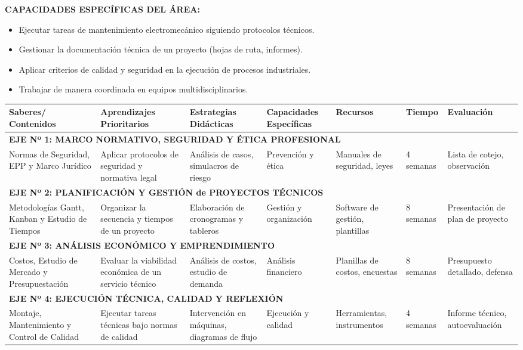 \documentclass[11pt, a4paper]{article}
\begin{document}
\vspace{1em}
\noindent \textbf{CAPACIDADES ESPECÍFICAS DEL ÁREA:}
\begin{itemize}
\item Ejecutar tareas de mantenimiento electromecánico siguiendo protocolos técnicos.
\item Gestionar la documentación técnica de un proyecto (hojas de ruta, informes).
\item Aplicar criterios de calidad y seguridad en la ejecución de procesos industriales.
\item Trabajar de manera coordinada en equipos multidisciplinarios.
\end{itemize}

\vspace{1em}
\begin{longtable}{|p{2.5cm}|p{3cm}|p{4cm}|p{3cm}|p{2.5cm}|p{1.5cm}|p{3cm}|}
\hline
\rowcolor{gray!20} \textbf{Saberes/ Contenidos} & \textbf{Aprendizajes Prioritarios} & \textbf{Estrategias Didácticas} & \textbf{Capacidades Específicas} & \textbf{Recursos} & \textbf{Tiempo} & \textbf{Evaluación} \\
\hline
\multicolumn{7}{|l|}{\textbf{EJE Nº 1: MARCO NORMATIVO, SEGURIDAD Y ÉTICA PROFESIONAL}} \\
\hline
Normas de Seguridad, EPP y Marco Jurídico & Aplicar protocolos de seguridad y normativa legal & Análisis de casos, simulacros de riesgo & Prevención y ética & Manuales de seguridad, leyes & 4 semanas & Lista de cotejo, observación \\
\hline
\multicolumn{7}{|l|}{\textbf{EJE Nº 2: PLANIFICACIÓN Y GESTIÓN de PROYECTOS TÉCNICOS}} \\
\hline
Metodologías Gantt, Kanban y Estudio de Tiempos & Organizar la secuencia y tiempos de un proyecto & Elaboración de cronogramas y tableros & Gestión y organización & Software de gestión, plantillas & 8 semanas & Presentación de plan de proyecto \\
\hline
\multicolumn{7}{|l|}{\textbf{EJE Nº 3: ANÁLISIS ECONÓMICO Y EMPRENDIMIENTO}} \\
\hline
Costos, Estudio de Mercado y Presupuestación & Evaluar la viabilidad económica de un servicio técnico & Análisis de costos, estudio de demanda & Análisis financiero & Planillas de costos, encuestas & 8 semanas & Presupuesto detallado, defensa \\
\hline
\multicolumn{7}{|l|}{\textbf{EJE Nº 4: EJECUCIÓN TÉCNICA, CALIDAD Y REFLEXIÓN}} \\
\hline
Montaje, Mantenimiento y Control de Calidad & Ejecutar tareas técnicas bajo normas de calidad & Intervención en máquinas, diagramas de flujo & Ejecución y calidad & Herramientas, instrumentos & 4 semanas & Informe técnico, autoevaluación \\
\hline
\end{longtable}
\end{document}
